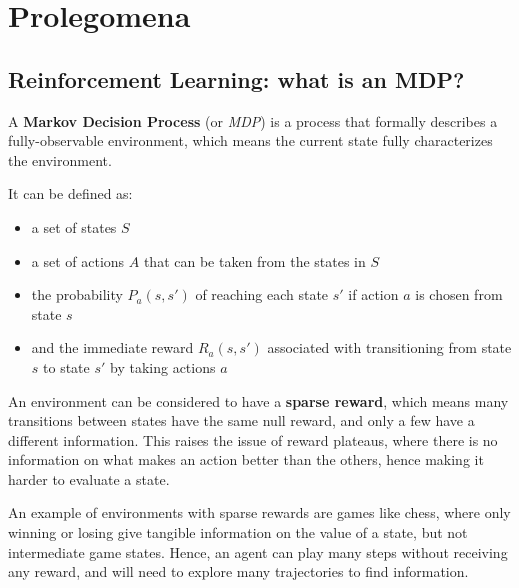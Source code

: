 \chapter{Prolegomena}
\label{chap:prolegomena}

\section{Reinforcement Learning: what is an MDP?}

A \textbf{Markov Decision Process} \cite{mdp} (or \textit{MDP}) is a process that formally describes a fully-observable environment, which means the current state fully characterizes the environment. 

It can be defined as:

\begin{itemize}
    \item a set of states $S$
    \item a set of actions $A$ that can be taken from the states in $S$
    \item the probability $P_a(s, s')$ of reaching each state $s'$ if action $a$ is chosen from state $s$
    \item and the immediate reward $R_a(s, s')$ associated with transitioning from state $s$ to state $s'$ by taking actions $a$
\end{itemize}

An environment can be considered to have a \textbf{sparse reward}, which means many transitions between states have the same null reward, and only a few have a different information. This raises the issue of reward plateaus, where there is no information on what makes an action better than the others, hence making it harder to evaluate a state.

An example of environments with sparse rewards are games like chess, where only winning or losing give tangible information on the value of a state, but not intermediate game states. Hence, an agent can play many steps without receiving any reward, and will need to explore many trajectories to find information.
      

